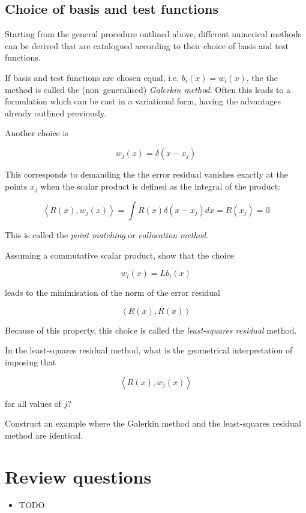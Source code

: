 \subsection{Choice of basis and test functions}

Starting from the general procedure outlined above, different numerical methods can be derived that are catalogued according to their choice of basis and test functions.

If basis and test functions are chosen equal, i.e. $b_i(x) = w_i(x)$, the the method is called the (non--generalised) \emph{Galerkin method}. Often this leads to a formulation which can be cast in a variational form, having the advantages already outlined previously.

Another choice is

\begin{equation}
w_j(x) = \delta(x-x_j)
\end{equation} 

This corresponds to demanding the the error residual vanishes exactly at the points $x_j$ when the scalar product is defined as the integral of the product:

\begin{equation}
\left\langle R(x), w_j(x) \right\rangle = \int R(x) \delta(x-x_j) dx = R(x_j) = 0
\end{equation} 

This is called the \emph{point matching} or \emph{collocation method}.


\begin{exer}
Assuming a commutative scalar product, show that the choice 

$$w_i(x) = L b_i(x)$$

leads to the minimisation of the norm of the error residual 

$$\left\langle R(x), R(x) \right\rangle$$ 

Because of this property, this choice is called the \emph{least-squares residual} method.
\end{exer}



\begin{exer}
In the least-squares residual method, what is the geometrical interpretation of imposing that 

$$\left\langle R(x), w_j(x) \right\rangle$$ 

for all values of $j$?
\end{exer}



\begin{exer}
Construct an example where the Galerkin method and the least-squares residual method are identical.
\end{exer}



\section*{Review questions}

\begin{itemize}
\item TODO
\end{itemize}

